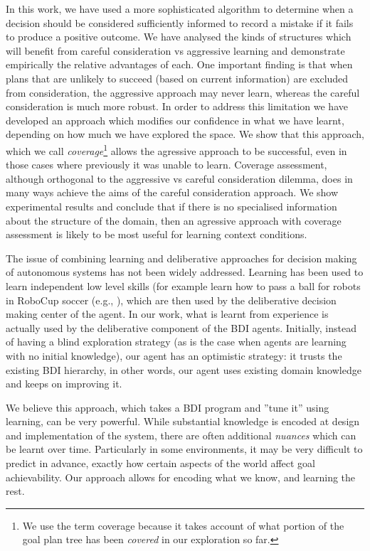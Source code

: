 In this work, we have used a more sophisticated algorithm to determine
when a decision should be considered sufficiently informed to record a
mistake if it fails to produce a positive outcome. We have 
analysed the kinds of structures which will benefit from careful
consideration vs aggressive learning and demonstrate empirically the
relative advantages of each. 
%
One important finding is that when plans that are unlikely to succeed
(based on current information) are excluded from consideration, the
aggressive approach may never learn, whereas the careful consideration
is much more robust.
% 
In order to address this limitation we have developed an approach which
modifies our confidence in what we have learnt, depending on how much
we have explored the space. We show that this approach, which we call
{\em coverage}\footnote{We use the term coverage because it takes
  account of what portion of the goal plan tree has been {\em covered}
  in our exploration so far.} allows the agressive
approach to be successful, even in those cases where previously it was
unable to learn. Coverage assessment, although orthogonal to the
aggressive vs careful consideration dilemma, does in many ways achieve
the aims of the careful consideration approach. We show experimental
results and conclude that if there is no specialised information about
the structure of the domain, then an agressive approach with coverage
assessment is likely to be most useful for learning context conditions.


The issue of combining learning and deliberative approaches for decision
making of autonomous systems has not been widely addressed. Learning
has been used to learn independent low level skills (for example learn
how to pass a ball for robots in RoboCup soccer (e.g., \cite{Riedmiller01}), which are
then used by the deliberative decision making center of the agent.  In
our work, what is learnt from experience is actually used by the
deliberative component of the BDI agents. Initially, instead of having
a blind exploration strategy 
(as is the case when agents are learning with no initial knowledge), 
our agent has an optimistic strategy: it trusts the existing BDI hierarchy, in other
words, our agent uses existing domain knowledge and keeps on improving
it.

We believe this approach, which takes a BDI program and 
''tune it'' using learning, can be very powerful. While substantial
knowledge is encoded at design and implementation of the system, there
are often additional \textit{nuances} which can be learnt over
time. Particularly in some environments, it may be very difficult to
predict in advance, exactly how certain aspects of the world affect
goal achievability. Our approach allows for encoding what we know,
and learning the rest.



